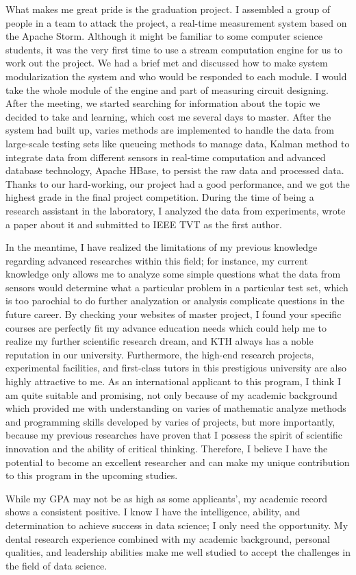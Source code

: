 \documentclass[12pt]{article}
\begin{document}
What makes me great pride is the graduation project. I assembled a group of people in a team to attack the project, a real-time measurement system based on the Apache Storm. Although it might be familiar to some computer science students, it was the very first time to use a stream computation engine for us to work out the project. We had a brief met and discussed how to make system modularization the system and who would be responded to each module. I would take the whole module of the engine and part of measuring circuit designing. After the meeting, we started searching for information about the topic we decided to take and learning, which cost me several days to master. After the system had built up, varies methods are implemented to handle the data from large-scale testing sets like queueing methods to manage data, Kalman method to integrate data from different sensors in real-time computation and advanced database technology, Apache HBase, to persist the raw data and processed data. Thanks to our hard-working, our project had a good performance, and we got the highest grade in the final project competition. During the time of being a research assistant in the laboratory, I analyzed the data from experiments, wrote a paper about it and submitted to IEEE TVT as the first author.

In the meantime, I have realized the limitations of my previous knowledge regarding advanced researches within this field; for instance, my current knowledge only allows me to analyze some simple questions what the data from sensors would determine what a particular problem in a particular test set, which is too parochial to do further analyzation or analysis complicate questions in the future career. By checking your websites of master project, I found your specific courses are perfectly fit my advance education needs which could help me to realize my further scientific research dream, and KTH always has a noble reputation in our university. Furthermore, the high-end research projects, experimental facilities, and first-class tutors in this prestigious university are also highly attractive to me. As an international applicant to this program, I think I am quite suitable and promising, not only because of my academic background which provided me with understanding on varies of mathematic analyze methods and programming skills developed by varies of projects, but more importantly, because my previous researches have proven that I possess the spirit of scientific innovation and the ability of critical thinking. Therefore, I believe I have the potential to become an excellent researcher and can make my unique contribution to this program in the upcoming studies.

While my GPA may not be as high as some applicants', my academic record shows a consistent positive. I know I have the intelligence, ability, and determination to achieve success in data science; I only need the opportunity. My dental research experience combined with my academic background, personal qualities, and leadership abilities make me well studied to accept the challenges in the field of data science.
\end{document}
